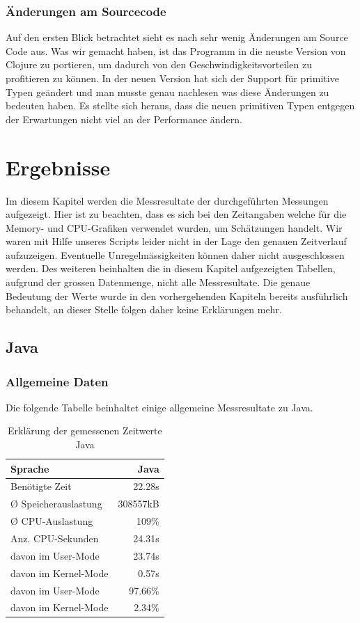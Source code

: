 \documentclass{fancydocument}
\begin{document}
\subsubsection{\"Anderungen am Sourcecode}

Auf den ersten Blick betrachtet sieht es nach sehr wenig Änderungen am
Source Code aus. Was wir gemacht haben, ist das Programm in die neuste
Version von Clojure zu portieren, um dadurch von den Geschwindigkeitsvorteilen
zu profitieren zu können. In der neuen Version hat sich der Support f\"ur
primitive Typen ge\"andert und man musste
genau nachlesen was diese \"Anderungen zu bedeuten haben. Es stellte
sich heraus, dass die neuen primitiven Typen entgegen der Erwartungen nicht viel an der Performance ändern.
\newpage
\section{Ergebnisse}
Im diesem Kapitel werden die Messresultate der durchgeführten Messungen aufgezeigt. Hier ist zu beachten, dass es sich bei den Zeitangaben welche für die Memory- und CPU-Grafiken verwendet wurden, um Schätzungen handelt. Wir waren mit Hilfe unseres Scripts leider nicht in der Lage den genauen Zeitverlauf aufzuzeigen. Eventuelle Unregelmässigkeiten können daher nicht ausgeschlossen werden. Des weiteren beinhalten die in diesem Kapitel aufgezeigten Tabellen, aufgrund der grossen Datenmenge, nicht alle Messresultate. Die genaue Bedeutung der Werte wurde in den vorhergehenden Kapiteln bereits ausführlich behandelt, an dieser Stelle folgen daher keine Erklärungen mehr.

\subsection{Java}
\subsubsection{Allgemeine Daten}
Die folgende Tabelle beinhaltet einige allgemeine Messresultate zu Java. 
\begin{table}[h!]
\centering
\begin{tabular}{|p{6cm}|r|} \hline
Sprache & Java\\
\hline
Benötigte Zeit & 22.28s\\
\hline
Ø Speicherauslastung & 308557kB\\
\hline
Ø CPU-Auslastung & 109\%\\
\hline
Anz. CPU-Sekunden & 24.31s\\
\hline
davon im User-Mode & 23.74s\\
\hline
davon im Kernel-Mode & 0.57s\\
\hline
davon im User-Mode & 97.66\%\\
\hline
davon im Kernel-Mode & 2.34\%\\
\hline
\end{tabular}
\caption{Erklärung der gemessenen Zeitwerte Java}
\end{table}
\end{document}
